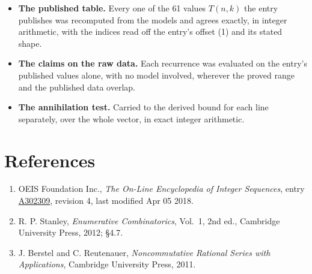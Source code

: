 \documentclass[11pt]{article}
\theoremstyle{definition}
\begin{document}
\begin{itemize}

\item {\bfseries The published table.} Every one of the 61 values $T(n,k)$ the entry publishes was recomputed from the models and agrees exactly, in integer arithmetic, with the indices read off the entry's offset (1) and its stated shape.

\item {\bfseries The claims on the raw data.} Each recurrence was evaluated on the entry's published values alone, with no model involved, wherever the proved range and the published data overlap.

\item {\bfseries The annihilation test.} Carried to the derived bound for each line separately, over the whole vector, in exact integer arithmetic.

\end{itemize}

\section{References}

\begin{enumerate}

\item OEIS Foundation Inc., \emph{The On-Line Encyclopedia of Integer Sequences}, entry \href{https://oeis.org/A302309}{A302309}, revision 4, last modified Apr 05 2018.

\item R. P. Stanley, \emph{Enumerative Combinatorics}, Vol.~1, 2nd ed., Cambridge University Press, 2012; \S4.7.

\item J. Berstel and C. Reutenauer, \emph{Noncommutative Rational Series with Applications}, Cambridge University Press, 2011.

\end{enumerate}
\end{document}
